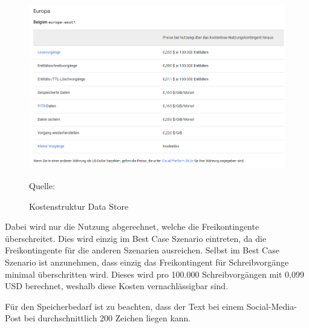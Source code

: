 \begin{figure}[htbp]
    \includegraphics[width=\textwidth, height=\textheight, keepaspectratio]{abbildungen/kostendatastore}
    \caption{Kostenstruktur Data Store}
    \label{fig:KostenDataStore}
    \vspace{0.5cm}
    \raggedright Quelle:\cite{GoogleDatastorePricing2025}
\end{figure}


Dabei wird nur die Nutzung abgerechnet, welche die Freikontingente überschreitet.
Dies wird einzig im Best Case Szenario eintreten, da die Freikontingente für die anderen Szenarien ausreichen.
Selbst im Best Case Szenario ist anzunehmen, dass einzig das Freikontingent für Schreibvorgänge minimal überschritten wird.
Dieses wird pro 100.000 Schreibvorgängen mit 0,099 \ac{USD} berechnet, weshalb diese Kosten vernachlässigbar sind.

Für den Speicherbedarf ist zu beachten, dass der Text bei einem Social-Media-Post bei durchschnittlich 200 Zeichen liegen kann.

